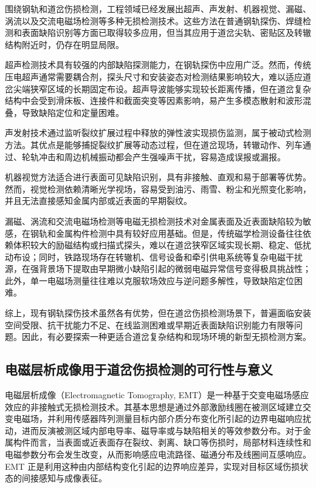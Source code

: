 围绕钢轨和道岔伤损检测，工程领域已经发展出超声、声发射、机器视觉、漏磁、涡流以及交流电磁场检测等多种无损检测技术。这些方法在普通钢轨探伤、焊缝检测和表面缺陷识别等方面已取得较多应用，但当其应用于道岔尖轨、密贴区及转辙结构附近时，仍存在明显局限。
 
超声检测技术具有较强的内部缺陷探测能力，在钢轨探伤中应用广泛。然而，传统压电超声通常需要耦合剂，探头尺寸和安装姿态对检测结果影响较大，难以适应道岔尖端狭窄区域的长期固定布设。超声导波能够实现较长距离传播，但在道岔复杂结构中会受到滑床板、连接件和截面突变等因素影响，易产生多模态散射和波形混叠，导致缺陷定位和定量困难。
 
声发射技术通过监听裂纹扩展过程中释放的弹性波实现损伤监测，属于被动式检测方法。其优点是能够捕捉裂纹扩展等动态过程，但在道岔现场，转辙动作、列车通过、轮轨冲击和周边机械振动都会产生强噪声干扰，容易造成误报或漏报。
 
机器视觉方法适合进行表面可见缺陷识别，具有非接触、直观和易于部署等优势。然而，视觉检测依赖清晰光学视场，容易受到油污、雨雪、粉尘和光照变化影响，并且无法直接感知金属内部或近表面的早期裂纹。
 
漏磁、涡流和交流电磁场检测等电磁无损检测技术对金属表面及近表面缺陷较为敏感，在钢轨和金属构件检测中具有较好应用基础。但是，传统磁学检测设备往往依赖体积较大的励磁结构或扫描式探头，难以在道岔狭窄区域实现长期、稳定、低扰动布设；同时，铁路现场存在转辙机、信号设备和牵引供电系统等复杂电磁干扰源，在强背景场下提取由早期微小缺陷引起的微弱电磁异常信号变得极具挑战性；此外，单一电磁场测量往往难以克服软场效应与逆问题多解性，导致缺陷定位困难。
 
综上，现有钢轨探伤技术虽然各有优势，但在道岔伤损检测场景下，普遍面临安装空间受限、抗干扰能力不足、在线监测困难或早期近表面缺陷识别能力有限等问题。因此，有必要探索一种更适合道岔复杂结构和现场环境的新型无损检测方案。

\subsection{电磁层析成像用于道岔伤损检测的可行性与意义}

电磁层析成像（Electromagnetic Tomography, EMT）是一种基于交变电磁场感应效应的非接触式无损检测技术。其基本思想是通过外部激励线圈在被测区域建立交变电磁场，并利用传感器阵列测量目标内部介质分布变化所引起的边界电磁响应扰动，进而反演被测区域内部电导率、磁导率或与缺陷相关的等效参数分布。对于金属构件而言，当表面或近表面存在裂纹、剥离、缺口等伤损时，局部材料连续性和电磁参数分布会发生改变，从而影响感应电流路径、磁通分布及线圈间互感响应。EMT 正是利用这种由内部结构变化引起的边界响应差异，实现对目标区域伤损状态的间接感知与成像表征。

